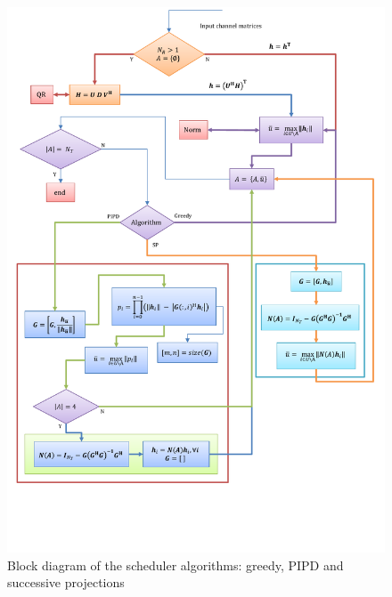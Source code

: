 \documentclass[11pt]{beamer}
\begin{document}
\begin{landscape}
\begin{frame}[plain]
	\begin{figure}
		\centering
		\includegraphics[trim=0.5in 1.5in 0in 1in,width=\columnwidth, angle=0]{Algorithm_Model}
		\caption{Block diagram of the scheduler algorithms: greedy, PIPD and successive projections}
	\end{figure}
\end{frame}
\end{landscape}
\end{document}
